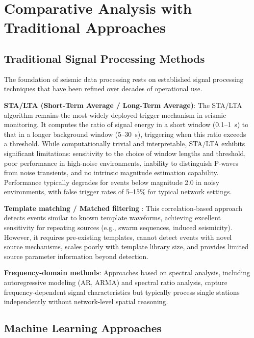 \documentclass[review,authoryear]{elsarticle}
\begin{document}
\clearpage
\section{Comparative Analysis with Traditional Approaches}
\label{sec:comparison}

\subsection{Traditional Signal Processing Methods}

The foundation of seismic data processing rests on established signal processing techniques that have been refined over decades of operational use.

\textbf{STA/LTA (Short-Term Average / Long-Term Average)}: The STA/LTA algorithm \citep{allen1978automatic} remains the most widely deployed trigger mechanism in seismic monitoring. It computes the ratio of signal energy in a short window (0.1--1~s) to that in a longer background window (5--30~s), triggering when this ratio exceeds a threshold. While computationally trivial and interpretable, STA/LTA exhibits significant limitations: sensitivity to the choice of window lengths and threshold, poor performance in high-noise environments, inability to distinguish P-waves from noise transients, and no intrinsic magnitude estimation capability. Performance typically degrades for events below magnitude 2.0 in noisy environments, with false trigger rates of 5--15\% for typical network settings.

\textbf{Template matching / Matched filtering} \citep{gibbons2006detection}: This correlation-based approach detects events similar to known template waveforms, achieving excellent sensitivity for repeating sources (e.g., swarm sequences, induced seismicity). However, it requires pre-existing templates, cannot detect events with novel source mechanisms, scales poorly with template library size, and provides limited source parameter information beyond detection.

\textbf{Frequency-domain methods}: Approaches based on spectral analysis, including autoregressive modeling (AR, ARMA) and spectral ratio analysis, capture frequency-dependent signal characteristics but typically process single stations independently without network-level spatial reasoning.

\subsection{Machine Learning Approaches}
\end{document}
